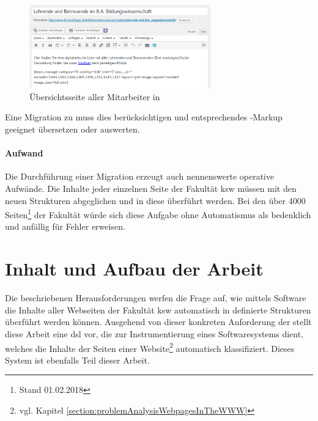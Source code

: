         \begin{figure}[htb]
            \centering
            \includegraphics[width=0.7\textwidth]{../resources/wordpress/teachers-overview.png}
            \caption{Übersichtsseite aller Mitarbeiter in {\wordpress}}
            \label{image:introductionFernUniWordpressOverviewForm}
        \end{figure}

        Eine Migration zu {\imperia} muss dies berücksichtigen und entsprechendes {\wordpress}-Markup
        geeignet übersetzen oder auswerten.

        \paragraph{Aufwand}
        Die Durchführung einer Migration erzeugt auch nennenswerte operative Aufwände.
        Die Inhalte jeder einzelnen Seite der Fakultät \gls{ksw} müssen
        mit den neuen Strukturen abgeglichen und in diese überführt werden.
        Bei den über 4000 Seiten\footnote{Stand 01.02.2018} der Fakultät
        würde sich diese Aufgabe ohne Automatismus als bedenklich und anfällig für Fehler erweisen.

    \section{Inhalt und Aufbau der Arbeit}
        Die beschriebenen Herausforderungen
        werfen die Frage auf, wie mittels Software die Inhalte aller Webseiten der Fakultät \gls{ksw}
        automatisch in definierte Strukturen überführt werden können.
        Ausgehend von dieser konkreten Anforderung der {\fernUni} stellt diese Arbeit eine
        \gls{dsl} vor, die zur Instrumentierung eines Softwaresystems dient,
        welches die Inhalte der Seiten einer
        Website\footnote{vgl. Kapitel \ref{section:problemAnalysisWebpagesInTheWWW}}
        automatisch klassifiziert.
        Dieses System ist ebenfalls Teil dieser Arbeit.

